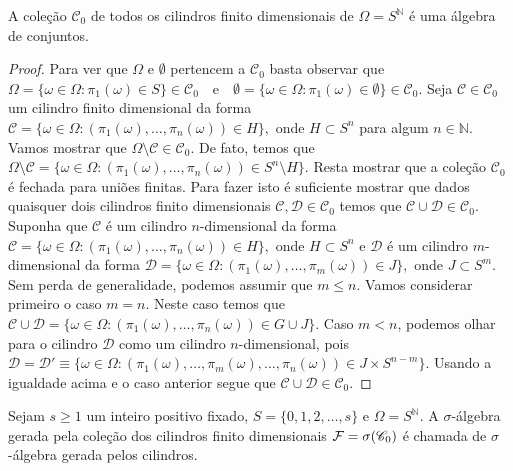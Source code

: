\begin{lema}
A coleção $\mathscr{C}_0$ de todos os cilindros finito dimensionais de 
$\Omega = S^{\mathbb{N}}$ é uma álgebra de conjuntos.
\end{lema}

\begin{proof}
Para ver que $\Omega$ e $\emptyset$ pertencem a 
$\mathscr{C}_0$ basta observar que 
$
\Omega 
= 
\{\omega\in \Omega: \pi_1(\omega)\in S\}
\in
\mathscr{C}_0
%
\quad
\text{e}
\quad
%
\emptyset
=
\{\omega\in \Omega: \pi_1(\omega)\in \emptyset\}
\in
\mathscr{C}_0.
$
%
Seja $\mathcal{C}\in \mathscr{C}_0$ um cilindro finito dimensional
da forma 
$
\mathcal{C}
=
\{
\omega\in \Omega:
(\pi_1(\omega), \ldots,\pi_n(\omega)) \in H
\},
$
onde
$H\subset S^n$ para algum $n\in\mathbb{N}$.
Vamos mostrar que $\Omega\setminus \mathcal{C}\in \mathscr{C}_0$.
De fato, temos que 
$
\Omega\setminus \mathcal{C}
=
\{
\omega\in \Omega:
(\pi_1(\omega), \ldots,\pi_n(\omega)) \in S^n\setminus H
\}.
$
Resta mostrar que a coleção $\mathscr{C}_0$ é fechada 
para uniões finitas. Para fazer isto é suficiente mostrar
que dados quaisquer dois cilindros finito dimensionais 
$\mathcal{C},\mathcal{D}\in\mathscr{C}_0$ temos que 
$\mathcal{C}\cup \mathcal{D}\in\mathscr{C}_0$.
Suponha que $\mathcal{C}$ é um cilindro $n$-dimensional
da forma 
$
\mathcal{C}
=
\{\omega\in \Omega: (\pi_1(\omega),\ldots,\pi_n(\omega))\in H\},
$
onde $H\subset S^n$
e $\mathcal{D}$ é um cilindro $m$-dimensional
da forma 
$
\mathcal{D}
=
\{\omega\in \Omega: (\pi_1(\omega),\ldots,\pi_m(\omega))\in J\},
$
onde $J\subset S^m$.
Sem perda de generalidade, podemos assumir que $m\leq n$.
Vamos considerar primeiro o caso $m=n$. Neste caso 
temos que 
$
\mathcal{C}\cup\mathcal{D}
=
\{\omega\in \Omega: (\pi_1(\omega),\ldots,\pi_n(\omega))\in G\cup J\}.
$ 
Caso $m<n$, podemos olhar para o cilindro $\mathcal{D}$
como um cilindro $n$-dimensional, pois 
$
\mathcal{D}
=
\mathcal{D}'
\equiv 
\{
\omega\in \Omega: 
(\pi_1(\omega),\ldots,\pi_m(\omega),\ldots,\pi_n(\omega))
\in J\times S^{n-m}
\}.
$ 
Usando a igualdade acima e o caso anterior segue que 
$\mathcal{C}\cup\mathcal{D}\in\mathscr{C}_0$. 
\end{proof}



\begin{definicao}
Sejam $s\geq 1$ um inteiro positivo fixado, $S=\{0,1,2,\ldots,s\}$ 
e $\Omega=S^{\mathbb{N}}$. A $\sigma$-álgebra gerada pela coleção
dos cilindros finito dimensionais $\mathcal{F} =\sigma(\mathscr{C}_0)$ 
é chamada de $\sigma$-álgebra gerada pelos cilindros.
\end{definicao}

